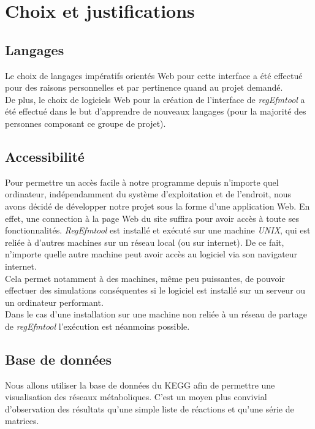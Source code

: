 \chapter{Choix et justifications}

\section{Langages}
Le choix de langages impératifs orientés Web pour cette interface a été effectué pour des raisons personnelles et par pertinence quand au projet demandé.\\
De plus, le choix de logiciels Web pour la création de l'interface de \emph{regEfmtool} a été effectué dans le but d'apprendre de nouveaux langages (pour la majorité des personnes composant ce groupe de projet).

\section{Accessibilité}
Pour permettre un accès facile à notre programme depuis n'importe quel ordinateur, indépendamment du système d'exploitation et de l'endroit, nous avons décidé de développer notre projet sous la forme d'une application Web. En effet, une connection à la page Web du site suffira pour avoir accès à toute ses fonctionnalités. \emph{RegEfmtool} est installé et exécuté sur une machine \emph{UNIX}, qui est reliée à d'autres machines sur un réseau local (ou sur internet). De ce fait, n'importe quelle autre machine peut avoir accès au logiciel via son navigateur internet.\\
Cela permet notamment à des machines, même peu puissantes, de pouvoir effectuer des simulations conséquentes si le logiciel est installé sur un serveur ou un ordinateur performant.\\
Dans le cas d'une installation sur une machine non reliée à un réseau de partage de \emph{regEfmtool} l'exécution est néanmoins possible.

\section{Base de données}
Nous allons utiliser la base de données du KEGG afin de permettre une visualisation des réseaux métaboliques. C'est un moyen plus convivial d'observation des résultats qu'une simple liste de réactions et qu'une série de matrices. 
